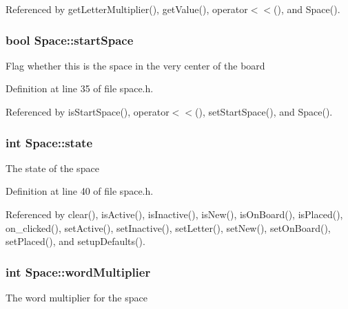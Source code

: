 Referenced by get\-Letter\-Multiplier(), get\-Value(), operator$<$$<$(), and Space().

\hypertarget{class_space_aa135c863552d2a89de1f5e1410fb9450}{
\subsubsection[{start\-Space}]{\setlength{\rightskip}{0pt plus 5cm}bool Space\-::start\-Space\hspace{0.3cm}{\ttfamily [private]}}}\label{class_space_aa135c863552d2a89de1f5e1410fb9450}
Flag whether this is the space in the very center of the board 

Definition at line 35 of file space.\-h.



Referenced by is\-Start\-Space(), operator$<$$<$(), set\-Start\-Space(), and Space().

\hypertarget{class_space_a9c634262ea140c752cd0f12ca8de3d63}{
\subsubsection[{state}]{\setlength{\rightskip}{0pt plus 5cm}int Space\-::state\hspace{0.3cm}{\ttfamily [private]}}}\label{class_space_a9c634262ea140c752cd0f12ca8de3d63}
The state of the space 

Definition at line 40 of file space.\-h.



Referenced by clear(), is\-Active(), is\-Inactive(), is\-New(), is\-On\-Board(), is\-Placed(), on\-\_\-clicked(), set\-Active(), set\-Inactive(), set\-Letter(), set\-New(), set\-On\-Board(), set\-Placed(), and setup\-Defaults().

\hypertarget{class_space_a00b205e763885903d7b8a811ae0daa54}{
\subsubsection[{word\-Multiplier}]{\setlength{\rightskip}{0pt plus 5cm}int Space\-::word\-Multiplier\hspace{0.3cm}{\ttfamily [private]}}}\label{class_space_a00b205e763885903d7b8a811ae0daa54}
The word multiplier for the space 

